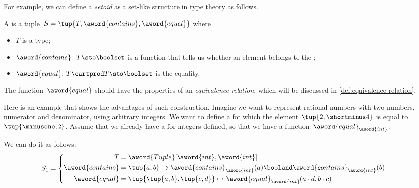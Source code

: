 For example, we can define a \emph{setoid} as a set-like structure in type theory as follows.

\begin{ctdefinition}[Setoid]
    \label{def:setoid}
    A  is a tuple~$S = \tup{T, \aword{contains}, \aword{equal}}$ where
    \begin{itemize}
        \item $T$ is a type;
        \item $\aword{contains}\colon T\sto\boolset$ is a function that tells us whether an element belongs to the ;
        \item $\aword{equal}\colon T\cartprod T\sto\boolset$ is the equality.
    \end{itemize}
\end{ctdefinition}
The function~$\aword{equal}$ should have the properties of an \emph{equivalence relation},
which will be discussed in \cref{def:equivalence-relation}.

Here is an example that shows the advantages of such construction.
Imagine we want to represent rational numbers with two numbers, numerator and denominator, using arbitrary integers.
We want to define a  for which the element~$\tup{2, \shortminus 4}$ is equal to~$\tup{\minusone, 2}$.
Assume that we already have a  for integers defined, so that we have a function~$\aword{equal}_{\aword{int}}$.

We can do it as follows:
\begin{equation}
    S_1 =
    \begin{cases}
        \begin{aligned}
            T                & =
            \aword{Tuple}[\aword{int}, \aword{int}]
            \\
            \aword{contains} & = \tup{a,b} \mapsto \aword{contains}_{\aword{int}}(a) \booland \aword{contains}_{\aword{int}}(b)
            \\
            \aword{equal}    & = \tup{\tup{a,b}, \tup{c,d}}
            \mapsto \aword{equal}_{\aword{int}} (a\cdot d, b\cdot c)
        \end{aligned}
    \end{cases}
\end{equation}

